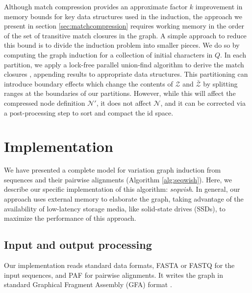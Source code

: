 \documentclass{bioinfo}
\theoremstyle{definition}
\begin{document}
Although match compression provides an approximate factor $k$ improvement in memory bounds for key data structures used in the induction, the approach we present in section \ref{sec:matchcompression} requires working memory in the order of the set of transitive match closures in the graph.
A simple approach to reduce this bound is to divide the induction problem into smaller pieces.
We do so by computing the graph induction for a collection of initial characters in $Q$.
In each partition, we apply a lock-free parallel union-find algorithm to derive the match closures \citep{anderson1991wait}, appending results to appropriate data structures.
This partitioning can introduce boundary effects which change the contents of $\mathcal{Z}$ and $\bar{\mathcal{Z}}$ by splitting ranges at the boundaries of our partitions.
However, while this will affect the compressed node definition $\mathcal{N}'$, it does not affect $\mathcal{N}$, and it can be corrected via a post-processing step to sort and compact the id space.


\section{Implementation}

We have presented a complete model for variation graph induction from sequences and their pairwise alignments (Algorithm \ref{alg:seqwish}).
Here, we describe our specific implementation of this algorithm: \textit{seqwish}.
In general, our approach uses external memory to elaborate the graph, taking advantage of the availability of low-latency storage media, like solid-state drives (SSDs), to maximize the performance of this approach.

\subsection{Input and output processing}

Our implementation reads standard data formats, FASTA or FASTQ for the input sequences, and PAF \citep{Li_2018} for pairwise alignments.
It writes the graph in standard Graphical Fragment Assembly (GFA) format \citep{GFA}.
\end{document}
